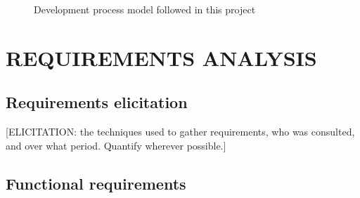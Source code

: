 
\begin{figure}[H]
  \centering
  \caption{Development process model followed in this project}
  \label{fig:process-model}
\end{figure}

\section{REQUIREMENTS ANALYSIS}
\label{sec:requirements-analysis}

\subsection{Requirements elicitation}
\label{subsec:elicitation}

[ELICITATION: the techniques used to gather requirements, who was
consulted, and over what period. Quantify wherever possible.]

\subsection{Functional requirements}
\label{subsec:functional-requirements}

